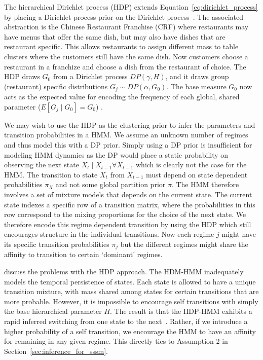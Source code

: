 The hierarchical Dirichlet process (HDP) extends Equation~\ref{eq:dirichlet_process} by placing a Dirichlet process prior on the Dirichlet process~\citep{teh2005sharing}. The associated abstraction is the Chinese Restaurant Franchise (CRF) where restaurants may have menus that offer the same dish, but may also have dishes that are restaurant specific. This allows restaurants to assign different mass to table clusters where the customers still have the same dish. Now customers choose a restaurant in a franchize and choose a dish from the restaurant of choice. The HDP draws $G_0$ from a Dirichlet process $DP(\gamma, H)$, and it draws group (restaurant) specific distributions $G_j \sim DP(\alpha, G_0)$. The base measure $G_0$ now acts as the expected value for encoding the frequency of each global, shared parameter ($E[G_j \mid G_0] = G_0$) \citep{fox2007hierarchical}.

We may wish to use the HDP as the clustering prior to infer the parameters and transition probabilities in a HMM. We assume an unknown number of regimes and thus model this with a DP prior. Simply using a DP prior is insufficient for modeling HMM dynamics as the DP would place a static probability on observing the next state $X_t \mid X_{t-1} \forall X_{t-1}$ which is clearly not the case for the HMM. The transition to state $X_t$ from $X_{t-1}$ must depend on state dependent probabilities $\pi_X$ and not some global partition prior $\pi$. The HMM therefore involves a set of mixture models that depends on the current state. The current state indexes a specific row of a transition matrix, where the probabilities in this row correspond to the mixing proportions for the choice of the next state. We therefore encode this regime dependent transition by using the HDP which still encourages structure in the individual transitions. Now each regime $j$ might have its specific transition probabilities $\pi_j$ but the different regimes might share the affinity to transition to certain `dominant' regimes.

\cite{fox2009nonparametric, fox2007hierarchical} discuss the problems with the HDP approach. The HDM-HMM inadequately models the temporal persistence of states. Each state is allowed to have a unique transition mixture, with mass shared among states for certain transitions that are more probable. However, it is impossible to encourage self transitions with simply the base hierarchical parameter $H$. The result is that the HDP-HMM exhibits a rapid inferred switching from one state to the next~\citep{fox2007hierarchical}. Rather, if we introduce a higher probability of a self transition, we encourage the HMM to have an affinity for remaining in any given regime. This directly ties to Assumption 2 in Section~\ref{sec:inference_for_sssm}.

